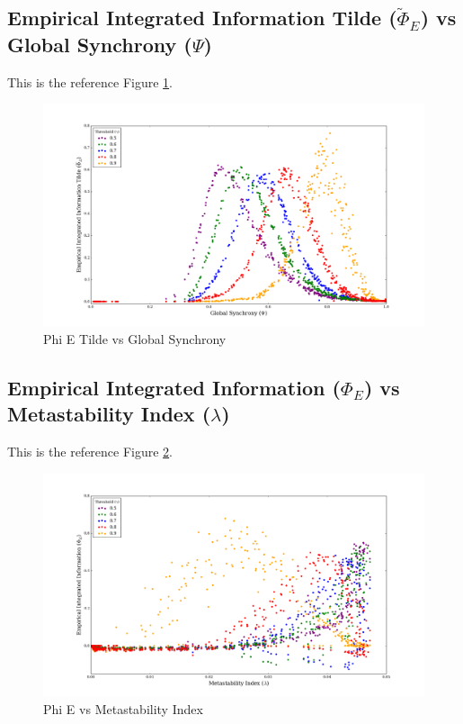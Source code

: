 \documentclass[a4paper,11pt]{article}
\begin{document}
\subsection{Empirical Integrated Information Tilde ($\widetilde{\Phi}_{E}$) vs Global Synchrony ($\Psi$)}

This is the reference Figure \ref{fig:phi-tilde-vs-psi-multi}.

\begin{figure}[H]
\begin{center}
\includegraphics[scale = 0.35]{figures/phi_tilde_vs_psi_multi}
\caption{
	Phi E Tilde vs Global Synchrony
	\label{fig:phi-tilde-vs-psi-multi}
}
\end{center}
\end{figure}

\subsection{Empirical Integrated Information ($\Phi_{E}$) vs Metastability Index ($\lambda$)}

This is the reference Figure \ref{fig:phi-vs-lambda-multi}.

\begin{figure}[H]
\begin{center}
\includegraphics[scale = 0.35]{figures/phi_vs_lambda_multi}
\caption{
	Phi E vs Metastability Index
	\label{fig:phi-vs-lambda-multi}
}
\end{center}
\end{figure}
\end{document}
